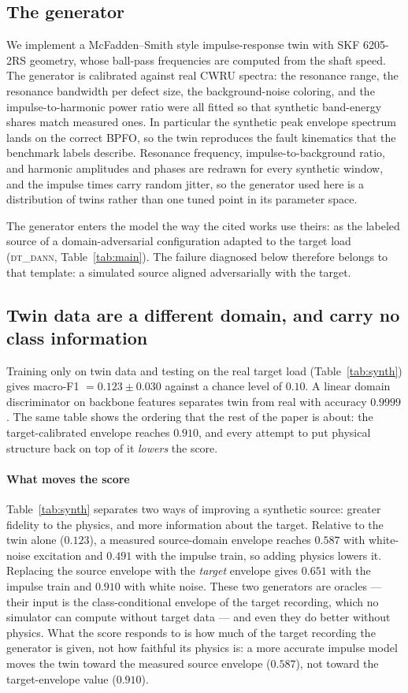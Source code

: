 \documentclass[journal]{IEEEtran}
\newcommand{\ml}[1]{\textsc{#1}}
\begin{document}
\subsection{The generator}
We implement a McFadden--Smith style impulse-response twin
\cite{randall2011rolling} with SKF 6205-2RS geometry, whose
ball-pass frequencies are computed from the shaft speed. The generator is
calibrated against real CWRU spectra: the resonance range, the resonance
bandwidth per defect size, the background-noise coloring, and the
impulse-to-harmonic power ratio were all fitted so that synthetic
band-energy shares match measured ones. In particular the synthetic peak
envelope spectrum lands on the correct BPFO, so the twin reproduces the fault
kinematics that the benchmark labels describe. Resonance frequency,
impulse-to-background ratio, and harmonic amplitudes and phases are redrawn for
every synthetic window, and the impulse times carry random jitter, so the
generator used here is a distribution of twins rather than one tuned point in
its parameter space.

The generator enters the model the way the cited works use theirs: as the
labeled source of a domain-adversarial configuration adapted to the target load
(\ml{dt\_dann}, Table~\ref{tab:main}). The failure diagnosed below therefore
belongs to that template: a simulated source aligned adversarially with the
target.

\subsection{Twin data are a different domain, and carry no class information}
Training only on twin data and testing on the real target load
(Table~\ref{tab:synth}) gives macro-F1 $=0.123 \pm 0.030$ against a chance
level of $0.10$. A linear domain discriminator on backbone features separates
twin from real with accuracy $0.9999$. The same table shows the ordering that
the rest of the paper is about: the target-calibrated envelope reaches $0.910$,
and every attempt to put physical structure back on top of it \emph{lowers}
the score.

\paragraph{What moves the score}
Table~\ref{tab:synth} separates two ways of improving a synthetic source:
greater fidelity to the physics, and more information about the target.
Relative to the twin alone ($0.123$), a measured source-domain envelope reaches
$0.587$ with white-noise excitation and $0.491$ with the impulse train, so
adding physics lowers it. Replacing the source envelope with the \emph{target}
envelope gives $0.651$ with the impulse train and $0.910$ with white noise.
These two generators are oracles --- their input is the class-conditional
envelope of the target recording, which no simulator can compute without target
data --- and even they do better without physics. What the score responds to is
how much of the target recording the generator is given, not how faithful its
physics is: a more accurate impulse model moves the twin toward the measured
source envelope ($0.587$), not toward the target-envelope value ($0.910$).
\end{document}
